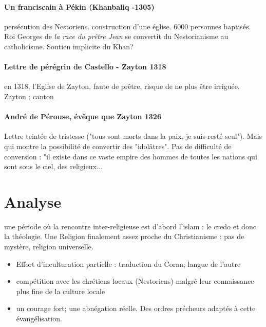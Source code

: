 \paragraph{Un franciscain à Pékin (Khanbaliq -1305)}  persécution des Nestoriens. construction d'une église. 6000 personnes baptisés. Roi Georges de \textit{la race du prêtre Jean} se convertit du Nestorianisme au catholicisme. Soutien implicite du Khan?


\paragraph{Lettre de pérégrin de Castello - Zayton 1318} en 1318, l'Eglise de Zayton, faute de prêtre, risque de ne plus être irriguée. Zayton : canton

\paragraph{André de Pérouse, évêque que Zayton 1326} Lettre teintée de tristesse ("tous sont morts dans la paix, je suis resté seul"). Mais qui montre la possibilité de convertir des "idolâtres". Pas de difficulté de conversion : "il existe dans ce vaste empire des hommes de toutes les nations qui sont sous le ciel, des religieux...

\section{Analyse}

\begin{Synthesis}

une période où la rencontre inter-religieuse est d'abord l'islam : le credo et donc la théologie. Une Religion finalement assez proche du Christianisme : pas de mystère, religion universelle. 
\begin{itemize}
\item  Effort d'inculturation partielle : traduction du Coran; langue de l'autre
\item  compétition avec les chrétiens locaux (Nestoriens) malgré leur connaissance plus fine de la culture locale
\item un courage fort; une abnégation réelle. Des ordres précheurs adaptés à cette évangélisation.

\end{itemize}


\end{Synthesis}


